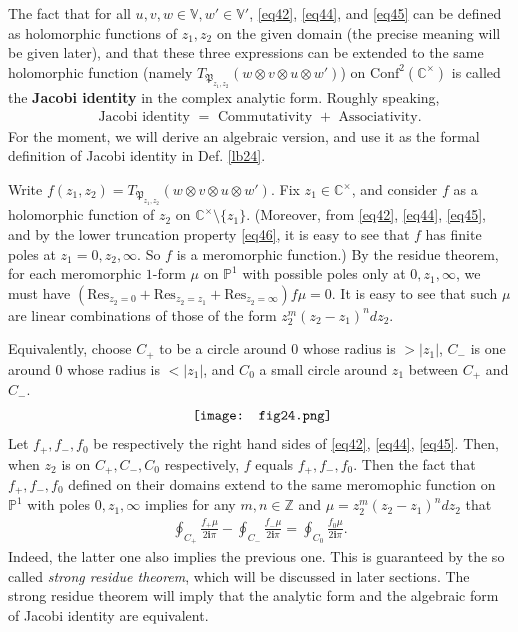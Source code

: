 \documentclass[12pt,a4paper,notitlepage]{article}
\theoremstyle{definition}
\theoremstyle{plain}
\newcommand{\fk}{\mathfrak}
\newcommand{\Conf}{\mathrm{Conf}}
\newcommand{\Res}{\mathrm{Res}}
\newcommand{\im}{\mathbf{i}}
\newcommand{\Vbb}{\mathbb V}
\newcommand{\Cbb}{\mathbb C}
\newcommand{\Zbb}{\mathbb Z}
\newcommand{\Pbb}{\mathbb P}
\numberwithin{equation}{section}
\begin{document}
The fact that for all $u,v,w\in\Vbb,w'\in\Vbb'$, \eqref{eq42}, \eqref{eq44}, and \eqref{eq45} can be defined as holomorphic functions of $z_1,z_2$ on the given domain (the precise meaning will be given later), and that these three expressions can be extended to the same holomorphic function (namely $T_{\fk P_{z_1,z_2}}(w\otimes v\otimes u\otimes w')$) on $\Conf^2(\Cbb^\times)$ is called the \textbf{Jacobi identity} in the complex analytic form. Roughly speaking,
\begin{align}
\text{Jacobi identity $=$ Commutativity $+$ Associativity}.\label{eq73}
\end{align}
For the moment, we will derive an algebraic version, and use it as the formal definition of Jacobi identity in Def. \ref{lb24}. 

Write $f(z_1,z_2)=T_{\fk P_{z_1,z_2}}(w\otimes v\otimes u\otimes w')$.  Fix $z_1\in \Cbb^\times$, and consider $f$ as a holomorphic function of $z_2$ on $\Cbb^\times\setminus\{z_1\}$. (Moreover, from \eqref{eq42}, \eqref{eq44}, \eqref{eq45}, and by the lower truncation property \eqref{eq46}, it is easy to see that $f$ has finite poles at $z_1=0,z_2,\infty$. So $f$ is a meromorphic function.) By the residue theorem, for each meromorphic  $1$-form $\mu$ on $\Pbb^1$ with possible poles only at $0,z_1,\infty$, we must have $(\Res_{z_2=0}+\Res_{z_2=z_1}+\Res_{z_2=\infty})f\mu=0$. It is easy to see that such $\mu$ are linear combinations of those of the form $z_2^m(z_2-z_1)^ndz_2$.

Equivalently, choose $C_+$ to be a circle around $0$ whose radius is  $>|z_1|$, $C_-$ is one around $0$ whose radius is $<|z_1|$, and $C_0$  a small circle around $z_1$ between $C_+$ and $C_-$. 
\begin{align*}
	\vcenter{\hbox{{
				\texttt{[image: fig24.png]}}}}
\end{align*}
Let $f_+,f_-,f_0$ be respectively the right hand sides of \eqref{eq42}, \eqref{eq44}, \eqref{eq45}. Then, when $z_2$ is on $C_+,C_-,C_0$ respectively, $f$ equals $f_+,f_-,f_0$. Then the fact that $f_+,f_-,f_0$ defined on their domains extend to the same meromophic function on $\Pbb^1$ with poles $0,z_1,\infty$ implies for any $m,n\in\Zbb$ and $\mu=z_2^m(z_2-z_1)^ndz_2$ that
\begin{align}
	\oint_{C_+}\frac{f_+\mu}{2\im\pi} -\oint_{C_-}\frac{f_-\mu}{2\im\pi}=\oint_{C_0} \frac{f_0\mu}{2\im\pi}.\label{eq48}
\end{align}
Indeed, the latter one also implies the previous one. This is guaranteed by the so called \emph{strong residue theorem}, which will be discussed in later sections. The strong residue theorem will imply that the analytic form and the algebraic form of Jacobi identity are equivalent.
\end{document}
